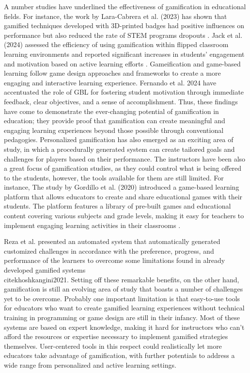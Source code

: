 A number studies have underlined the effectiveness of gamification in educational fields. For instance, the work by Lara-Cabrera et al. (2023) has shown that gamified techniques developed with 3D-printed badges had positive influences on performance but also reduced the rate of STEM programs dropouts \cite{lara2023badges}. Jack et al. (2024) assessed the efficiency of using gamification within flipped classroom learning environments and reported significant increases in students' engagement and motivation based on active learning efforts \cite{jack2024gamification}. Gameification and game-based learning follow game design approaches and frameworks to create a more engaging and interactive learning experience. Fernando et al. 2024 have accentuated the role of GBL for fostering student motivation through immediate feedback, clear objectives, and a sense of accomplishment. Thus, these findings have come to demonstrate the ever-changing potential of gamification in education; they provide proof that gamification can create meaningful and engaging learning experiences beyond those possible through conventional pedagogies. Personalized gamification has also emerged as an exciting area of study, in which a procedurally generated system can create tailored goals and challenges for players based on their performance. The instructors have been also a great focus of gamification studies, as they could control what is being offered to the students, however, the tools available for them are still limited. For instance, The study by Gordillo et al. (2020) introduced a game-based learning platform that allows educators to create and share educational games with their students. The platform features a library of pre-built games and educational content covering various subjects and grade levels, making it easy for teachers to implement engaging learning activities in their classrooms \cite{sgame2020}.

Reza et al. presented an automated system that automatically generated customized challenges in accordance with the preference, progress, and performance of the learners to overcome some limitations found in already developed gamified systems \\cite{khoshkangini2021}. Setting off these remarkable benefits, on the other hand, gamification is still an evolving area of study that boasts a number of challenges yet to be overcome. Probably one important limitation is that easy-to-use tools for educators who want to create gamified learning experiences without technical training in programming or game design are still in their infancy. Most of these systems are based on expert knowledge, making it hard for instructors who can't afford the resources or expertise necessary to implement gamified strategies themselves. User-centered tools in this respect could realistically let more educators take advantage of gamification, with further potentials to address a wide range from personalized and active learning settings.